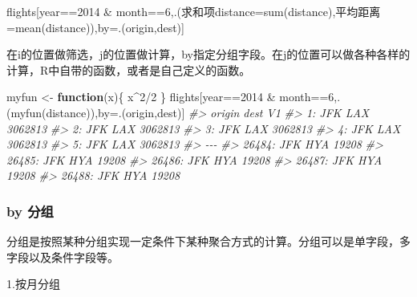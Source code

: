 \documentclass[
]{book}
\newenvironment{Shaded}{\begin{snugshade}}{\end{snugshade}}
\newcommand{\AttributeTok}[1]{\textcolor[rgb]{0.77,0.63,0.00}{#1}}
\newcommand{\CommentTok}[1]{\textcolor[rgb]{0.56,0.35,0.01}{\textit{#1}}}
\newcommand{\ControlFlowTok}[1]{\textcolor[rgb]{0.13,0.29,0.53}{\textbf{#1}}}
\newcommand{\DecValTok}[1]{\textcolor[rgb]{0.00,0.00,0.81}{#1}}
\newcommand{\FunctionTok}[1]{\textcolor[rgb]{0.00,0.00,0.00}{#1}}
\newcommand{\NormalTok}[1]{#1}
\newcommand{\OtherTok}[1]{\textcolor[rgb]{0.56,0.35,0.01}{#1}}
\newcommand{\SpecialCharTok}[1]{\textcolor[rgb]{0.00,0.00,0.00}{#1}}
\begin{document}
\begin{Shaded}
\begin{Highlighting}[]
\NormalTok{flights[year}\SpecialCharTok{==}\DecValTok{2014} \SpecialCharTok{\&}\NormalTok{ month}\SpecialCharTok{==}\DecValTok{6}\NormalTok{,.(求和项}\AttributeTok{distance=}\FunctionTok{sum}\NormalTok{(distance),平均距离}\OtherTok{=}\FunctionTok{mean}\NormalTok{(distance)),by}\OtherTok{=}\NormalTok{.(origin,dest)]}
\end{Highlighting}
\end{Shaded}

在i的位置做筛选，j的位置做计算，by指定分组字段。在j的位置可以做各种各样的计算，R中自带的函数，或者是自己定义的函数。

\begin{Shaded}
\begin{Highlighting}[]
\NormalTok{myfun }\OtherTok{\textless{}{-}} \ControlFlowTok{function}\NormalTok{(x)\{}
\NormalTok{    x}\SpecialCharTok{\^{}}\DecValTok{2}\SpecialCharTok{/}\DecValTok{2}
\NormalTok{\}}
\NormalTok{flights[year}\SpecialCharTok{==}\DecValTok{2014} \SpecialCharTok{\&}\NormalTok{ month}\SpecialCharTok{==}\DecValTok{6}\NormalTok{,.(}\FunctionTok{myfun}\NormalTok{(distance)),by}\OtherTok{=}\NormalTok{.(origin,dest)]}
\CommentTok{\#\textgreater{}        origin dest      V1}
\CommentTok{\#\textgreater{}     1:    JFK  LAX 3062813}
\CommentTok{\#\textgreater{}     2:    JFK  LAX 3062813}
\CommentTok{\#\textgreater{}     3:    JFK  LAX 3062813}
\CommentTok{\#\textgreater{}     4:    JFK  LAX 3062813}
\CommentTok{\#\textgreater{}     5:    JFK  LAX 3062813}
\CommentTok{\#\textgreater{}    {-}{-}{-}                    }
\CommentTok{\#\textgreater{} 26484:    JFK  HYA   19208}
\CommentTok{\#\textgreater{} 26485:    JFK  HYA   19208}
\CommentTok{\#\textgreater{} 26486:    JFK  HYA   19208}
\CommentTok{\#\textgreater{} 26487:    JFK  HYA   19208}
\CommentTok{\#\textgreater{} 26488:    JFK  HYA   19208}
\end{Highlighting}
\end{Shaded}

\hypertarget{by-ux5206ux7ec4}{%
\subsubsection{by 分组}\label{by-ux5206ux7ec4}}

分组是按照某种分组实现一定条件下某种聚合方式的计算。分组可以是单字段，多字段以及条件字段等。

1.按月分组
\end{document}
